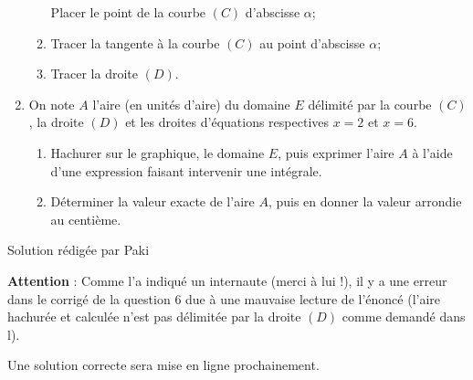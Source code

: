 \begin{enumerate}
\begin{enumerate}[label=\alph*.]
          Placer le point de la courbe $\left(C\right)$ d'abscisse $\alpha $;
          \item
          Tracer la tangente à la courbe $\left(C\right)$ au point d'abscisse $\alpha $;
          \item
     Tracer la droite $\left(D\right)$.\end{enumerate}
     \item
     On note $A$ l'aire (en unités d'aire) du domaine $E$ délimité par la courbe $\left(C\right)$, la droite $\left(D\right)$ et les droites d'équations respectives $x=2$ et $x=6$.
     \begin{enumerate}[label=\alph*.]
          \item
          Hachurer sur le graphique, le domaine $E$, puis exprimer l'aire  $A$ à l'aide d'une expression faisant intervenir une intégrale.
          \item
          Déterminer la valeur exacte de l'aire $A$, puis en donner la valeur arrondie au centième.
     \end{enumerate}
\end{enumerate}

\begin{center}
\end{center}

\begin{corrige}

     Solution rédigée par Paki
     \par
     \textbf{Attention} : Comme l'a indiqué un internaute (merci à lui !), il y a une erreur dans le corrigé de la question 6 due à une mauvaise lecture de l'énoncé (l'aire hachurée et calculée n'est pas délimitée par la droite $\left(D\right)$ comme demandé dans l).
     \par
     Une solution correcte sera mise en ligne prochainement.
\begin{center}
\end{center}
\end{corrige}

